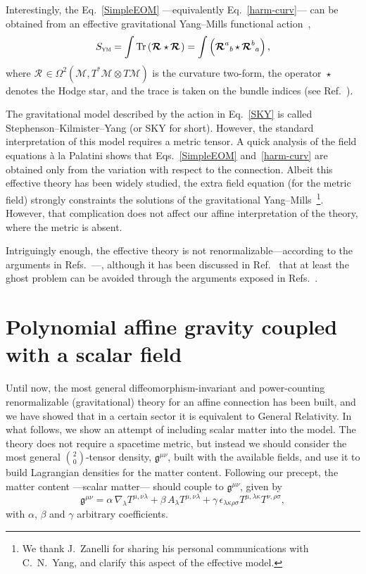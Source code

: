 \documentclass[aps,prd,12pt,twocolumn,superscriptaddress,showpacs,showkeys,reprint%
]{revtex4-1}
\DeclareMathOperator{\st}{\star}
\newcommand{\Mi}{\mathcal{M}}
\newcommand{\Rif}[2]{\boldsymbol{\mathcal{R}}^{{#1}}{}_{{#2}}}
\newcommand{\Tr}{\operatorname{Tr}}
\renewcommand{\(}{\left(}
\renewcommand{\)}{\right)}
\renewcommand{\[}{\left[}
\renewcommand{\]}{\right]}
\begin{document}
Interestingly, the Eq.~\eqref{SimpleEOM} ---equivalently Eq.~\eqref{harm-curv}--- can be obtained from an effective gravitational Yang--Mills functional action~\cite{stephenson1958quadratic,kilmister1961use,Yang1974}, %
\begin{equation}
  \label{SKY}
  S_{\textsc{ym}} = \int \Tr \left( \Rif{}{} \st \Rif{}{} \right) = \int \left( \Rif{a}{b} \st \Rif{b}{a} \right),
\end{equation}
where $\Rif{}{} \in \Omega^2(\Mi, T^*\Mi \otimes T\Mi)$ is the curvature two-form, the operator $\st$ denotes the Hodge star, and the trace is taken on the bundle indices (see Ref.~\cite{bourguignon1982yang}).

The gravitational model described by the action in Eq.~\eqref{SKY} is called Stephenson--Kilmister--Yang (or SKY for short). However, the standard interpretation of this model requires a metric tensor. A quick analysis of the field equations \`a la Palatini shows that Eqs.~\eqref{SimpleEOM} and~\eqref{harm-curv} are obtained only from the variation with respect to the connection. Albeit this effective theory has been widely studied, the extra field equation (for the metric field) strongly constraints the solutions of the gravitational Yang--Mills~\footnote{We thank J.~Zanelli for sharing his personal communications with C.~N.~Yang, and clarify this aspect of the effective model.}. However, that complication does not affect our affine interpretation of the theory, where the metric is absent.

Intriguingly enough, the effective theory is not renormalizable---according to the arguments in Refs.~\cite{McGady:2013sga,Camanho:2014apa}---, although it has been discussed in Ref.~\cite{Chen:2010at} that at least the ghost problem can be avoided through the arguments exposed in Refs.~\cite{Kleinert:1987eb,Bender:2007wu,Bender:2008vh,Mannheim:2009zj}.


\section{\label{matter}Polynomial affine gravity coupled with a scalar field}

Until now, the most general diffeomorphism-invariant and power-counting renormalizable (gravitational) theory for an affine connection has been built, and we have showed that in a certain sector it is equivalent to General Relativity. In what follows, we show an attempt of including scalar matter into the model. The theory does not require a spacetime metric, but instead we should consider the most general $\binom{2}{0}$-tensor density, $\mathfrak{g}^{\mu\nu}$,  built with the available fields, and use it to build Lagrangian densities for the matter content. Following our precept, the matter content ---scalar matter--- should couple to $\mathfrak{g}^{\mu\nu}$, given by
\begin{dmath}
  \mathfrak{g}^{\mu\nu} = \alpha \, \nabla_\lambda T^{\mu,\nu\lambda} + \beta \, A_\lambda T^{\mu,\nu\lambda} + \gamma \, \epsilon_{\lambda\kappa\rho\sigma} T^{\mu, \lambda\kappa} T^{\nu, \rho\sigma},
  \label{geng}
\end{dmath}
with $\alpha$, $\beta$ and $\gamma$ arbitrary coefficients.
\end{document}

